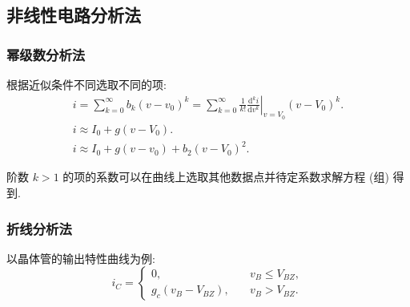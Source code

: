 \subsection{非线性电路分析法}
\subsubsection{幂级数分析法}

根据近似条件不同选取不同的项:
\begin{gather}
    i=\sum_{k=0}^{\infty}b_k(v-v_0)^k=\sum_{k=0}^{\infty}\frac{1}{k!}\left.\frac{\mathrm{d}^k i}{\mathrm{d}v^k}\right|_{v=V_0}(v-V_0)^k. \label{eq:4.2 current power sum} \\
    i\approx I_0+g(v-V_0). \\
    i\approx I_0+g(v-v_0)+b_2(v-V_0)^2.
\end{gather}

阶数 $k>1$ 的项的系数可以在曲线上选取其他数据点并待定系数求解方程 (组) 得到.

\subsubsection{折线分析法}

以晶体管的输出特性曲线为例:
\begin{equation}
    i_C=\begin{cases}
        0,               & \quad v_B\leq V_{BZ}, \\
        g_c(v_B-V_{BZ}), & \quad v_B>V_{BZ}.
    \end{cases}
\end{equation}
